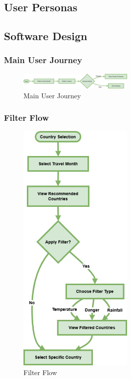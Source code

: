 \documentclass[]{project_final}
\begin{document}
\subsection{User Personas}
\subsection{Software Design}
\subsubsection{Main User Journey}

\begin{figure}[ht!]
    \centering
    \includegraphics[width=0.5\textwidth]{TPMainUserJourney.drawio.png}
    \vspace*{0.0cm}
    \caption{Main User Journey}
    \label{fig:1}
\end{figure}

\newpage
\subsubsection{Filter Flow}

\begin{figure}[ht!]
    \centering
    \includegraphics[width=0.5\textwidth]{TPFilterFlow.png}
    \vspace*{0.0cm}
    \caption{Filter Flow}
    \label{fig:1}
\end{figure}
\end{document}
